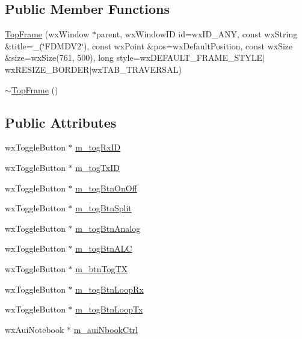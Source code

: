 \subsection*{Public Member Functions}
\begin{DoxyCompactItemize}
\item 
\hyperlink{class_top_frame_af89867621f7fa66c9865f09a1245153c}{Top\-Frame} (wx\-Window $\ast$parent, wx\-Window\-I\-D id=wx\-I\-D\-\_\-\-A\-N\-Y, const wx\-String \&title=\-\_\-(\char`\"{}F\-D\-M\-D\-V2\char`\"{}), const wx\-Point \&pos=wx\-Default\-Position, const wx\-Size \&size=wx\-Size(761, 500), long style=wx\-D\-E\-F\-A\-U\-L\-T\-\_\-\-F\-R\-A\-M\-E\-\_\-\-S\-T\-Y\-L\-E$|$wx\-R\-E\-S\-I\-Z\-E\-\_\-\-B\-O\-R\-D\-E\-R$|$wx\-T\-A\-B\-\_\-\-T\-R\-A\-V\-E\-R\-S\-A\-L)
\item 
\hyperlink{class_top_frame_ac367aaa31fe85041940f21a63ed1b33f}{$\sim$\-Top\-Frame} ()
\end{DoxyCompactItemize}
\subsection*{Public Attributes}
\begin{DoxyCompactItemize}
\item 
wx\-Toggle\-Button $\ast$ \hyperlink{class_top_frame_ab66518823dd4d7b1f2802676ac651cdc}{m\-\_\-tog\-Rx\-I\-D}
\item 
wx\-Toggle\-Button $\ast$ \hyperlink{class_top_frame_af862a4419c535f7ffef6f23b9f2e2a7d}{m\-\_\-tog\-Tx\-I\-D}
\item 
wx\-Toggle\-Button $\ast$ \hyperlink{class_top_frame_a6c398070906190fbf6c6c3d663cc33ed}{m\-\_\-tog\-Btn\-On\-Off}
\item 
wx\-Toggle\-Button $\ast$ \hyperlink{class_top_frame_a787ed365379f1fc2a2b51bbde67ad575}{m\-\_\-tog\-Btn\-Split}
\item 
wx\-Toggle\-Button $\ast$ \hyperlink{class_top_frame_ab788d1aa2da2f2c1458bc7315c7beeef}{m\-\_\-tog\-Btn\-Analog}
\item 
wx\-Toggle\-Button $\ast$ \hyperlink{class_top_frame_ac0cb4ac628d6bd0e25aee632eb9330d2}{m\-\_\-tog\-Btn\-A\-L\-C}
\item 
wx\-Toggle\-Button $\ast$ \hyperlink{class_top_frame_a1b6c8716d6993f0c28f00a5c6ada789b}{m\-\_\-btn\-Tog\-T\-X}
\item 
wx\-Toggle\-Button $\ast$ \hyperlink{class_top_frame_a2d5a5aded2c12ce13c90f64e7321896c}{m\-\_\-tog\-Btn\-Loop\-Rx}
\item 
wx\-Toggle\-Button $\ast$ \hyperlink{class_top_frame_a545f431235514c6ea5aaa461c413e15b}{m\-\_\-tog\-Btn\-Loop\-Tx}
\item 
wx\-Aui\-Notebook $\ast$ \hyperlink{class_top_frame_af2bf3b05c2e23a16d9b74d8689c83dca}{m\-\_\-aui\-Nbook\-Ctrl}
\end{DoxyCompactItemize}

